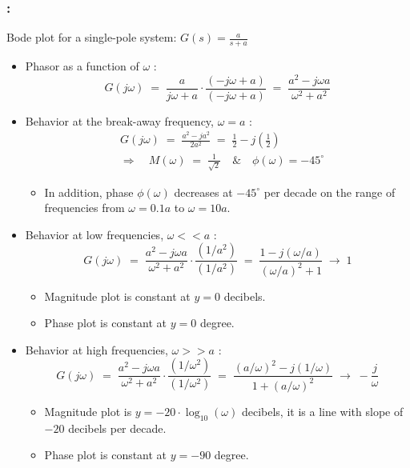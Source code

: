 \documentclass[ 10pt, xcolor = dvipsnames]{beamer}
\begin{document}
\begin{frame}[allowframebreaks]
\frametitle{\insertsection: \insertsubsection}

Bode plot for a single-pole system: $\displaystyle G(s) = \frac{a}{s+a}$
\begin{itemize}
\item Phasor as a function of $\omega$ : 
\[
G(j\omega) \; = \; \frac{a}{j\omega + a} \cdot \frac{(-j\omega + a)}{(-j\omega + a)} \; = \; \frac{a^2 - j \omega a}{\omega^2 + a^2} 
\]
\item Behavior at the break-away frequency, \ie $\omega = a$ :
\begin{align*}
& G(j\omega) \; = \;
\frac{a^2 - ja^2}{2a^2} \; = \; 
\frac{1}{2} - j \left( \frac{1}{2} \right) \\[1ex]
& \Longrightarrow \quad
M(\omega) \; = \; \frac{1}{\sqrt{2}} \quad \& \quad \phi(\omega) = -45^{\circ}
\end{align*}
\halfcut
\begin{itemize}
\item In addition, phase $\phi(\omega)$ decreases at $-45^{\circ}$ per decade on the range of frequencies from $\omega = 0.1 a$ to $\omega = 10 a$. 
\end{itemize}

\framebreak

\item Behavior at low frequencies, \ie $\omega << a$ :
\[
G(j\omega) \; = \;
\frac{a^2 - j \omega a}{\omega^2 + a^2}
\cdot \frac{(1/a^2)}{(1/a^2)} \; = \; 
\frac{1 - j(\omega/a)}{(\omega/a)^2 + 1}
\; \longrightarrow \; 1
\]
\fullcut
\begin{itemize}
\item Magnitude plot is constant at $y = 0$ decibels. 
\item Phase plot is constant at $y = 0$ degree. 
\end{itemize}
\halfskip
\item Behavior at high frequencies, \ie $\omega >> a$ :
\[
G(j\omega) \; = \;
\frac{a^2 - j \omega a}{\omega^2 + a^2}
\cdot \frac{(1/\omega^2)}{(1/\omega^2)} \; = \; 
\frac{(a/\omega)^2 - j(1/\omega)}{1 + (a/\omega)^2}
\; \longrightarrow \; -\frac{j}{\omega}
\]
\fullcut
\begin{itemize}
\item Magnitude plot is $y = -20 \cdot \log_{10}(\omega)$ decibels, \ie it is a line with slope of $-20$ decibels per decade. 
\item Phase plot is constant at $y = -90$ degree. 
\end{itemize}

\end{itemize}

\end{frame}
\end{document}
